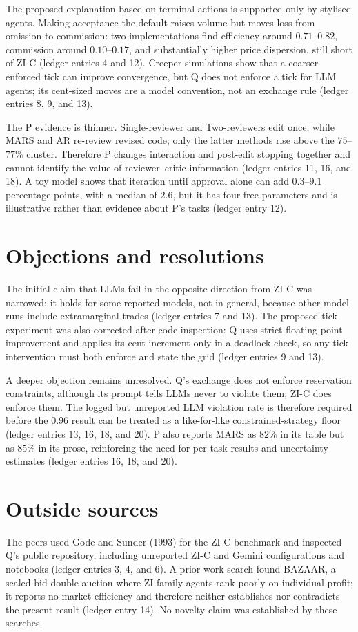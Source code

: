 \documentclass{article}
\begin{document}
The proposed explanation based on terminal actions is supported only by stylised agents. Making acceptance the default raises volume but moves loss from omission to commission: two implementations find efficiency around $0.71$--$0.82$, commission around $0.10$--$0.17$, and substantially higher price dispersion, still short of ZI-C (ledger entries 4 and 12). Creeper simulations show that a coarser enforced tick can improve convergence, but Q does not enforce a tick for LLM agents; its cent-sized moves are a model convention, not an exchange rule (ledger entries 8, 9, and 13).

The P evidence is thinner. Single-reviewer and Two-reviewers edit once, while MARS and AR re-review revised code; only the latter methods rise above the $75$--$77\%$ cluster. Therefore P changes interaction and post-edit stopping together and cannot identify the value of reviewer--critic information (ledger entries 11, 16, and 18). A toy model shows that iteration until approval alone can add $0.3$--$9.1$ percentage points, with a median of $2.6$, but it has four free parameters and is illustrative rather than evidence about P's tasks (ledger entry 12).

\section*{Objections and resolutions}
The initial claim that LLMs fail in the opposite direction from ZI-C was narrowed: it holds for some reported models, not in general, because other model runs include extramarginal trades (ledger entries 7 and 13). The proposed tick experiment was also corrected after code inspection: Q uses strict floating-point improvement and applies its cent increment only in a deadlock check, so any tick intervention must both enforce and state the grid (ledger entries 9 and 13).

A deeper objection remains unresolved. Q's exchange does not enforce reservation constraints, although its prompt tells LLMs never to violate them; ZI-C does enforce them. The logged but unreported LLM violation rate is therefore required before the $0.96$ result can be treated as a like-for-like constrained-strategy floor (ledger entries 13, 16, 18, and 20). P also reports MARS as $82\%$ in its table but as $85\%$ in its prose, reinforcing the need for per-task results and uncertainty estimates (ledger entries 16, 18, and 20).

\section*{Outside sources}
The peers used Gode and Sunder (1993) for the ZI-C benchmark and inspected Q's public repository, including unreported ZI-C and Gemini configurations and notebooks (ledger entries 3, 4, and 6). A prior-work search found BAZAAR, a sealed-bid double auction where ZI-family agents rank poorly on individual profit; it reports no market efficiency and therefore neither establishes nor contradicts the present result (ledger entry 14). No novelty claim was established by these searches.
\end{document}
